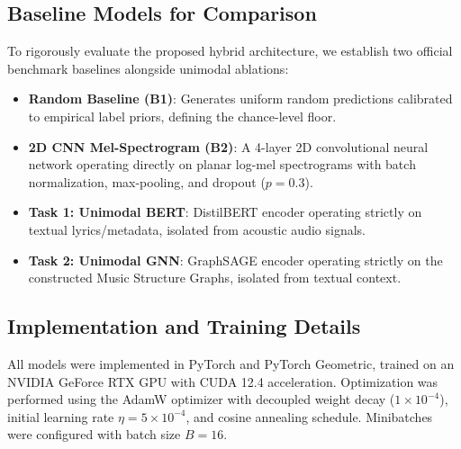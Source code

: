 \documentclass{article}
\begin{document}
\subsection{Baseline Models for Comparison}
To rigorously evaluate the proposed hybrid architecture, we establish two official benchmark baselines alongside unimodal ablations:
\begin{itemize}
    \item \textbf{Random Baseline (B1)}: Generates uniform random predictions calibrated to empirical label priors, defining the chance-level floor.
    \item \textbf{2D CNN Mel-Spectrogram (B2)}: A 4-layer 2D convolutional neural network operating directly on planar log-mel spectrograms with batch normalization, max-pooling, and dropout ($p=0.3$).
    \item \textbf{Task 1: Unimodal BERT}: DistilBERT encoder operating strictly on textual lyrics/metadata, isolated from acoustic audio signals.
    \item \textbf{Task 2: Unimodal GNN}: GraphSAGE encoder operating strictly on the constructed Music Structure Graphs, isolated from textual context.
\end{itemize}

\subsection{Implementation and Training Details}
All models were implemented in PyTorch and PyTorch Geometric, trained on an NVIDIA GeForce RTX GPU with CUDA 12.4 acceleration. Optimization was performed using the AdamW optimizer with decoupled weight decay ($1\times 10^{-4}$), initial learning rate $\eta = 5\times 10^{-4}$, and cosine annealing schedule. Minibatches were configured with batch size $B=16$.
\end{document}
